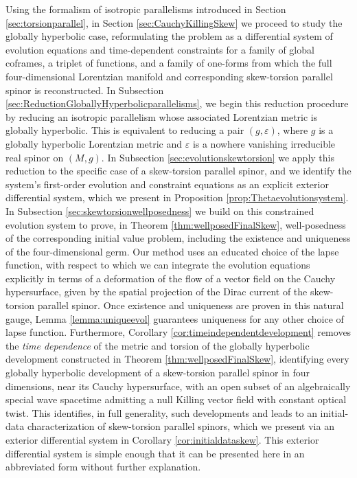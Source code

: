 \documentclass[10pt,reqno,a4paper]{amsart}
\theoremstyle{plain}
\theoremstyle{definition}
\theoremstyle{remark}
\theoremstyle{remark}
\renewcommand{\(}{ (}
\renewcommand{\)}{ )}
\begin{document}
Using the formalism of isotropic parallelisms introduced in Section \ref{sec:torsionparallel}, in Section \ref{sec:CauchyKillingSkew} we proceed to study the globally hyperbolic case, reformulating the problem as a differential system of evolution equations and time-dependent constraints for a family of global coframes, a triplet of functions, and a family of one-forms from which the full four-dimensional Lorentzian manifold and corresponding skew-torsion parallel spinor is reconstructed. In Subsection \ref{sec:ReductionGloballyHyperbolicparallelisms}, we begin this reduction procedure by reducing an isotropic parallelism whose associated Lorentzian metric is globally hyperbolic. This is equivalent to reducing a pair $(g,\varepsilon)$, where $g$ is a globally hyperbolic Lorentzian metric and $\varepsilon$ is a nowhere vanishing irreducible real spinor on $(M,g)$. In Subsection \ref{sec:evolutionskewtorsion} we apply this reduction to the specific case of a skew-torsion parallel spinor, and we identify the system's first-order evolution and constraint equations as an explicit exterior differential system, which we present in Proposition \ref{prop:Thetaevolutionsystem}. In Subsection \ref{sec:skewtorsionwellposedness} we build on this constrained evolution system to prove, in Theorem \ref{thm:wellposedFinalSkew}, well-posedness of the corresponding initial value problem, including the existence and uniqueness of the four-dimensional germ. Our method uses an educated choice of the lapse function, with respect to which we can integrate the evolution equations explicitly in terms of a deformation of the flow of a vector field on the Cauchy hypersurface, given by the spatial projection of the Dirac current of the skew-torsion parallel spinor. Once existence and uniqueness are proven in this natural gauge, Lemma \ref{lemma:uniqueevol} guarantees uniqueness for any other choice of lapse function. Furthermore, Corollary \ref{cor:timeindependentdevelopment} removes the \emph{time dependence} of the metric and torsion of the globally hyperbolic development constructed in Theorem \ref{thm:wellposedFinalSkew}, identifying every globally hyperbolic development of a skew-torsion parallel spinor in four dimensions, near its Cauchy hypersurface, with an open subset of an algebraically special wave spacetime admitting a null Killing vector field with constant optical twist. This identifies, in full generality, such developments and leads to an initial-data characterization of skew-torsion parallel spinors, which we present via an exterior differential system in Corollary \ref{cor:initialdataskew}. This exterior differential system is simple enough that it can be presented here in an abbreviated form without further explanation.
\end{document}

